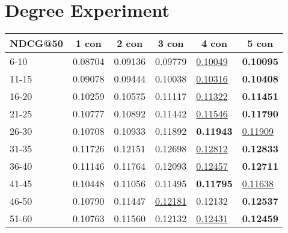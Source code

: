 \section{Degree Experiment}\label{app:degree-experiment}
\begin{table*}[]
    \centering
    \begin{tabular}{|l|l|l|l|l|l|}
        \hline
        NDCG@50 & \multicolumn{1}{c|}{1 con} & \multicolumn{1}{c|}{2 con} & \multicolumn{1}{c|}{3 con} & \multicolumn{1}{c|}{4 con} & \multicolumn{1}{c|}{5 con} \\ \hline
        6-10    & 0.08704                    & 0.09136                    & 0.09779                    & \underline{0.10049}        & \textbf{0.10095}           \\ \hline
        11-15   & 0.09078                    & 0.09444                    & 0.10038                    & \underline{0.10316}        & \textbf{0.10408}           \\ \hline
        16-20   & 0.10259                    & 0.10575                    & 0.11117                    & \underline{0.11322}        & \textbf{0.11451}           \\ \hline
        21-25   & 0.10777                    & 0.10892                    & 0.11442                    & \underline{0.11546}        & \textbf{0.11790}           \\ \hline
        26-30   & 0.10708                    & 0.10933                    & 0.11892                    & \textbf{0.11943}           & \underline{0.11909}        \\ \hline
        31-35   & 0.11726                    & 0.12151                    & 0.12698                    & \underline{0.12812}        & \textbf{0.12833}           \\ \hline
        36-40   & 0.11146                    & 0.11764                    & 0.12093                    & \underline{0.12457}        & \textbf{0.12711}           \\ \hline
        41-45   & 0.10448                    & 0.11056                    & 0.11495                    & \textbf{0.11795}           & \underline{0.11638}        \\ \hline
        46-50   & 0.10790                    & 0.11447                    & \underline{0.12181}        & 0.12132                    & \textbf{0.12537}           \\ \hline
        51-60   & 0.10763                    & 0.11560                    & 0.12132                    & \underline{0.12431}        & \textbf{0.12459}           \\ \hline

\end{tabular}
\end{table*}
